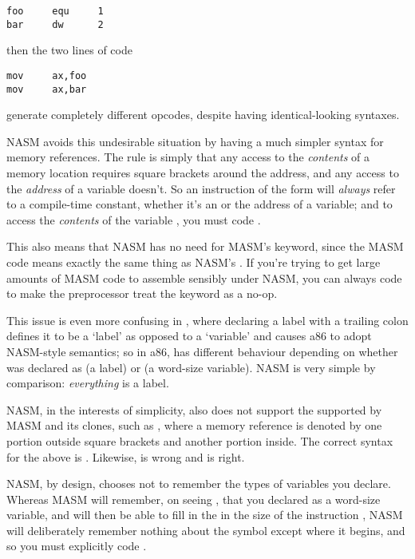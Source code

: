 \begin{lstlisting}
foo     equ     1
bar     dw      2
\end{lstlisting}

then the two lines of code

\begin{lstlisting}
mov     ax,foo
mov     ax,bar
\end{lstlisting}

generate completely different opcodes, despite having
identical-looking syntaxes.

NASM avoids this undesirable situation by having a much simpler
syntax for memory references. The rule is simply that any access to
the \emph{contents} of a memory location requires square brackets
around the address, and any access to the \emph{address} of a variable
doesn't. So an instruction of the form  will
\emph{always} refer to a compile-time constant, whether it's an 
or the address of a variable; and to access the \emph{contents} of the
variable , you must code .

This also means that NASM has no need for MASM's 
keyword, since the MASM code  means exactly the
same thing as NASM's . If you're trying to get
large amounts of MASM code to assemble sensibly under NASM, you
can always code  to make the preprocessor
treat the  keyword as a no-op.

This issue is even more confusing in , where declaring a
label with a trailing colon defines it to be a `label' as opposed to
a `variable' and causes a86 to adopt NASM-style semantics; so in
a86,  has different behaviour depending on whether
 was declared as  (a label) or
 (a word-size variable). NASM is very simple by
comparison: \emph{everything} is a label.

NASM, in the interests of simplicity, also does not support the
 supported by MASM and its clones, such as
, where a memory reference is denoted by one
portion outside square brackets and another portion inside. The
correct syntax for the above is . Likewise,
 is wrong and  is right.


NASM, by design, chooses not to remember the types of variables you
declare. Whereas MASM will remember, on seeing , that
you declared  as a word-size variable, and will then be able
to fill in the  in the size of the instruction
, NASM will deliberately remember nothing about
the symbol  except where it begins, and so you must
explicitly code .

